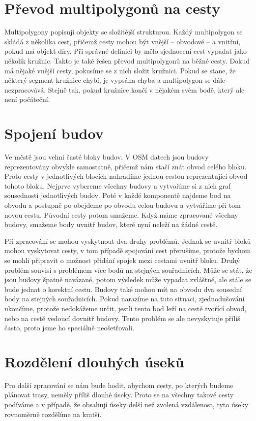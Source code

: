 \section{Převod multipolygonů na cesty}
Multipolygony popisují objekty se složitější strukturou. Každý multipolygon se
skládá z několika cest, přičemž cesty mohou být vnější -- obvodové -- a
vnitřní, pokud má objekt díry. Při správné definici by mělo sjednocení cest
vypadat jako několik kružnic. Takto je také řešen převod multipolygonů na běžné
cesty. Dokud má nějaké vnější cesty, pokusíme se z nich složit kružnici.  Pokud
se stane, že některý segment kružnice chybí, je vypsána chyba a multipolygon se
dále nezpracovává. Stejně tak, pokud kružnice končí v nějakém svém bodě, který
ale není počáteční. 

\section{Spojení budov}
Ve městě jsou velmi časté bloky budov. V OSM datech jsou budovy reprezentovány
obvykle samostatně, přičemž nám stačí znát obvod celého bloku. Proto cesty v
jednotlivých blocích nahradíme jednou cestou reprezentující obvod tohoto bloku.
Nejprve vybereme všechny budovy a vytvoříme si z nich graf sousednosti
jednotlivých budov. Poté v každé komponentě najdeme bod na obvodu a postupně
po obejdeme po obvodu celou budovu a vytváříme při tom novou cestu. Původní
cesty potom smažeme. Když máme zpracované všechny budovy, smažeme body uvnitř
budov, které nyní neleží na žádné cestě.

Při zpracování se mohou vyskytnout dva druhy problémů. Jednak se uvnitř bloků
mohou vyskytovat cesty, v tom případě spojování cest přerušíme, protože bychom
se mohli připravit o možnost přidání spojek mezi cestami uvnitř bloku. Druhý
problém souvisí s problémem více bodů na stejných souřadnicích. Může se stát, že
jsou budovy špatně navázané, potom výsledek může vypadat zvláštně, ale stále se
bude jednat o korektní cestu. Budovy také mohou mít na obvodu dva sousední body
na stejných souřadnicích. Pokud narazíme na tuto situaci, zjednodušování
ukončíme, protože nedokážeme určit, jestli tento bod leží na cestě tvořící
obvod, nebo na cestě vedoucí dovnitř budovy. Tento problém se ale nevyskytuje
příliš často, proto jsme ho speciálně neošetřovali.

\section{Rozdělení dlouhých úseků}
Pro další zpracování se nám bude hodit, abychom cesty, po kterých budeme
plánovat trasy, neměly příliš dlouhé úseky. Proto se na všechny takové cesty
podíváme a v případě, že obsahují úseky delší než zvolená vzdálenost, tyto úseky
rovnoměrně rozdělíme na kratší. 

